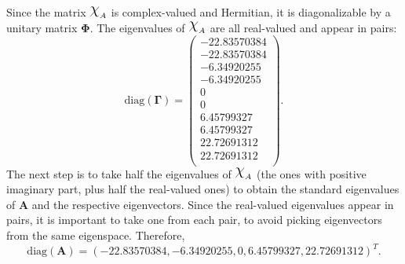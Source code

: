 Since the matrix $\rchi_A$ is complex-valued and Hermitian, it is diagonalizable by a unitary matrix $\mathbf{\Phi}$. The eigenvalues of $\rchi_A$ are all real-valued and appear in pairs:
\begin{equation*}
    \mathrm{diag}(\mathbf{\Gamma}) = \begin{pmatrix}
        -22.83570384 \\
        -22.83570384 \\
        -6.34920255  \\
        -6.34920255  \\
        0            \\
        0            \\
        6.45799327   \\
        6.45799327   \\
        22.72691312  \\
        22.72691312  \\
    \end{pmatrix}.
\end{equation*}
The next step is to take half the eigenvalues of $\rchi_A$ (the ones with positive imaginary part, plus half the real-valued ones) to obtain the standard eigenvalues of $\mathbf{A}$ and the respective eigenvectors. Since the real-valued eigenvalues appear in pairs, it is important to take one from each pair, to avoid picking eigenvectors from the same eigenspace. Therefore,
\begin{equation*}
\mathrm{diag}(\mathbf{A}) = (-22.83570384, -6.34920255, 0, 6.45799327, 22.72691312)^T.
\end{equation*}

